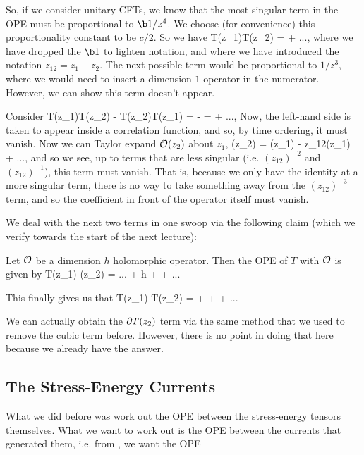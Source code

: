 So, if we consider unitary CFTs, we know that the most singular term in the OPE must be proportional to $\b1/z^4$. We choose (for convenience) this proportionality constant to be $c/2$. So we have 
\bse 
    T(z_1)T(z_2) =  + ...,
\ese 
where we have dropped the $\b1$ to lighten notation, and where we have introduced the notation $z_{12}=z_1-z_2$. The next possible term would be proportional to $1/z^3$, where we would need to insert a dimension $1$ operator in the numerator. However, we can show this term doesn't appear. 

Consider 
\bse 
    T(z_1)T(z_2) - T(z_2)T(z_1) =  -  =  + ...,
\ese 
Now, the left-hand side is taken to appear inside a correlation function, and so, by time ordering, it must vanish. Now we can Taylor expand $\mathcal{O}(z_2)$ about $z_1$, 
\bse 
    \cO(z_2) = \cO(z_1) - z_{12}\p\cO(z_1) + ...,
\ese 
and so we see, up to terms that are less singular (i.e. $(z_{12})^{-2}$ and $(z_{12})^{-1}$), this term must vanish. That is, because we only have the identity at a more singular term, there is no way to take something away from the $(z_{12})^{-3}$ term, and so the coefficient in front of the operator itself must vanish. 

We deal with the next two terms in one swoop via the following claim (which we verify towards the start of the next lecture): 

\bcl
\label{claim:TOTransformation}
Let $\mathcal{O}$ be a dimension $h$ holomorphic operator. Then the OPE of $T$ with $\mathcal{O}$ is given by 
\bse 
    T(z_1) \cO(z_2) = ... + h +  + ...
\ese 
\ecl 


This finally gives us that 
\be 
\label{eqn:TTOPE}
    T(z_1) T(z_2) =  +  +  + ... 
\ee 

\br 
We can actually obtain the $\partial T(z_2)$ term via the same method that we used to remove the cubic term before. However, there is no point in doing that here because we already have the answer.
\er 

\subsection{The Stress-Energy Currents}

What we did before was work out the OPE between the stress-energy tensors themselves. What we want to work out is the OPE between the currents that generated them, i.e. from , we want the OPE

